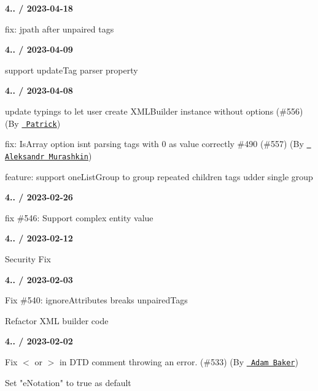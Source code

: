 {\bfseries{4.. / 2023-\/04-\/18}}
\begin{DoxyItemize}
\item fix\+: jpath after unpaired tags
\end{DoxyItemize}

{\bfseries{4.. / 2023-\/04-\/09}}
\begin{DoxyItemize}
\item support {\ttfamily update\+Tag} parser property
\end{DoxyItemize}

{\bfseries{4.. / 2023-\/04-\/08}}
\begin{DoxyItemize}
\item update typings to let user create XMLBuilder instance without options (\#556) (By \href{https://github.com/omggga}{\texttt{ Patrick}})
\item fix\+: Is\+Array option isn\textquotesingle{}t parsing tags with 0 as value correctly \#490 (\#557) (By \href{https://github.com/p-kuen}{\texttt{ Aleksandr Murashkin}})
\item feature\+: support {\ttfamily one\+List\+Group} to group repeated children tags udder single group
\end{DoxyItemize}

{\bfseries{4.. / 2023-\/02-\/26}}
\begin{DoxyItemize}
\item fix \#546\+: Support complex entity value
\end{DoxyItemize}

{\bfseries{4.. / 2023-\/02-\/12}}
\begin{DoxyItemize}
\item Security Fix
\end{DoxyItemize}

{\bfseries{4.. / 2023-\/02-\/03}}
\begin{DoxyItemize}
\item Fix \#540\+: ignore\+Attributes breaks unpaired\+Tags
\item Refactor XML builder code
\end{DoxyItemize}

{\bfseries{4.. / 2023-\/02-\/02}}
\begin{DoxyItemize}
\item Fix \textquotesingle{}\texorpdfstring{$<$}{<}\textquotesingle{} or \textquotesingle{}\texorpdfstring{$>$}{>}\textquotesingle{} in DTD comment throwing an error. (\#533) (By \href{https://github.com/Cwazywierdo}{\texttt{ Adam Baker}})
\item Set "{}e\+Notation"{} to \textquotesingle{}true\textquotesingle{} as default
\end{DoxyItemize}

